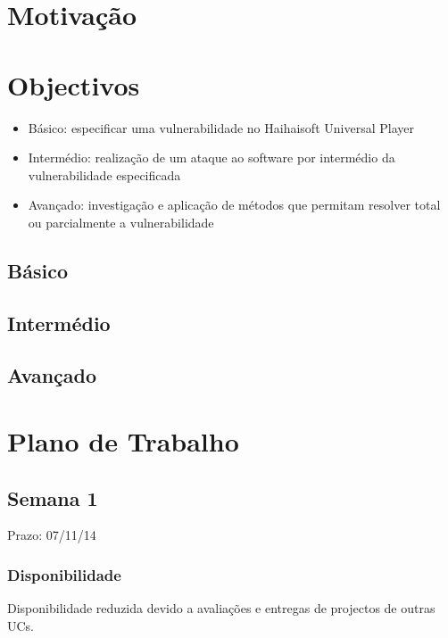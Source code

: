 \documentclass[a4paper]{article}
\begin{document}


\tableofcontents
\pagebreak

\section{Motivação}

\pagebreak

\section{Objectivos}

\begin{itemize}
	\item Básico: especificar uma vulnerabilidade no Haihaisoft Universal Player
	\item Intermédio: realização de um ataque ao software por intermédio da vulnerabilidade especificada
	\item Avançado: investigação e aplicação de métodos que permitam resolver total ou parcialmente a vulnerabilidade
\end{itemize}

\subsection{Básico}



\subsection{Intermédio}

\subsection{Avançado}

\pagebreak

\section{Plano de Trabalho}

\subsection{Semana 1}
Prazo: 07/11/14
\subsubsection{Disponibilidade}
Disponibilidade reduzida devido a avaliações e entregas de projectos de outras UCs.
\end{document}
